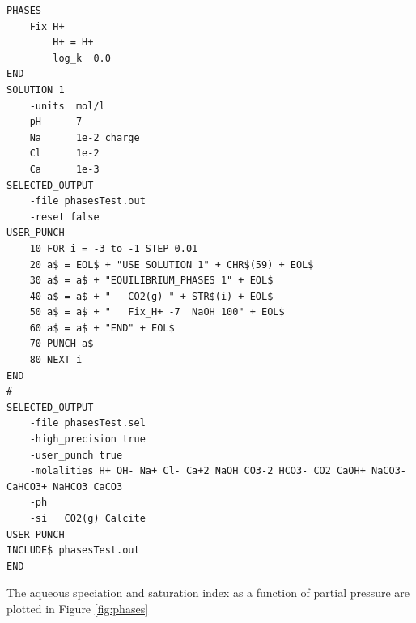 \documentclass{article}
\begin{document}
\begin{Verbatim}[frame=single,fontsize=\footnotesize]
PHASES
	Fix_H+
		H+ = H+
		log_k  0.0
END
SOLUTION 1
	-units	mol/l
	pH 		7
	Na 		1e-2 charge
	Cl 		1e-2
	Ca 		1e-3 
SELECTED_OUTPUT
    -file phasesTest.out
    -reset false
USER_PUNCH
	10 FOR i = -3 to -1 STEP 0.01
  	20 a$ = EOL$ + "USE SOLUTION 1" + CHR$(59) + EOL$
	30 a$ = a$ + "EQUILIBRIUM_PHASES 1" + EOL$
	40 a$ = a$ + "   CO2(g) " + STR$(i) + EOL$
	50 a$ = a$ + "   Fix_H+ -7  NaOH 100" + EOL$
	60 a$ = a$ + "END" + EOL$
	70 PUNCH a$
	80 NEXT i
END
#
SELECTED_OUTPUT
	-file phasesTest.sel
	-high_precision true
	-user_punch true
	-molalities H+ OH- Na+ Cl- Ca+2 NaOH CO3-2 HCO3- CO2 CaOH+ NaCO3- CaHCO3+ NaHCO3 CaCO3
	-ph
	-si   CO2(g) Calcite
USER_PUNCH
INCLUDE$ phasesTest.out
END
\end{Verbatim}
The aqueous speciation and saturation index as a function of  partial pressure are plotted in Figure \ref{fig:phases}
\end{document}
